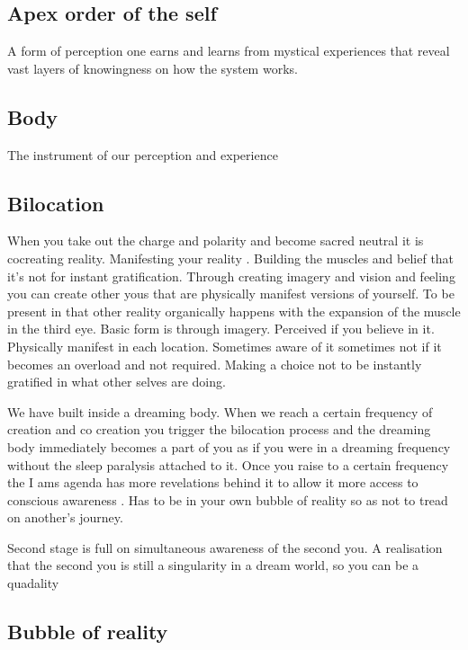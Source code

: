 \subsection{Apex order of the self}\label{apex-order-of-the-self}

A form of perception one earns and learns from mystical experiences that
reveal vast layers of knowingness on how the system works.

\subsection{Body}\label{body}

The instrument of our perception and experience

\subsection{Bilocation}\label{bilocation}

When you take out the charge and polarity and become sacred neutral it
is cocreating reality. Manifesting your reality . Building the muscles
and belief that it's not for instant gratification. Through creating
imagery and vision and feeling you can create other yous that are
physically manifest versions of yourself. To be present in that other
reality organically happens with the expansion of the muscle in the
third eye. Basic form is through imagery. Perceived if you believe in
it. Physically manifest in each location. Sometimes aware of it
sometimes not if it becomes an overload and not required. Making a
choice not to be instantly gratified in what other selves are doing.

We have built inside a dreaming body. When we reach a certain frequency
of creation and co creation you trigger the bilocation process and the
dreaming body immediately becomes a part of you as if you were in a
dreaming frequency without the sleep paralysis attached to it. Once you
raise to a certain frequency the I ams agenda has more revelations
behind it to allow it more access to conscious awareness . Has to be in
your own bubble of reality so as not to tread on another's journey.

Second stage is full on simultaneous awareness of the second you. A
realisation that the second you is still a singularity in a dream world,
so you can be a quadality

\subsection{Bubble of reality}\label{bubble-of-reality}

